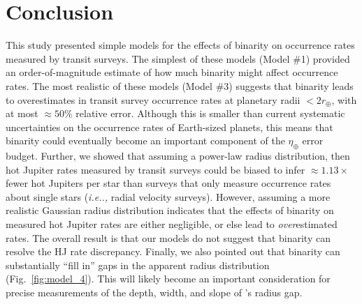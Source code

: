\documentclass[12pt,modern]{aastex61}
\begin{document}

%

\section{Conclusion}
\label{sec:conclusion}

This study presented simple models for the effects of binarity on occurrence 
rates measured by transit surveys.
The simplest of these models (Model \#1) provided an order-of-magnitude 
estimate of how much binarity might affect occurrence rates.
The most realistic of these models (Model \#3) suggests that binarity leads to 
overestimates in transit survey occurrence rates at planetary radii 
$<2r_\oplus$, with at most $\approx 50\%$ relative error.
Although this is smaller than current systematic uncertainties on the 
occurrence rates of Earth-sized planets, this means that binarity could
eventually become an important component of the $\eta_\oplus$ error budget.
Further, we showed that assuming a power-law radius distribution, 
then hot Jupiter rates measured by transit surveys could be biased to infer 
$\approx 1.13\times$ fewer hot Jupiters per star than surveys that only 
measure occurrence rates about single stars ({\it i.e..,} radial velocity 
surveys). However, assuming a more realistic Gaussian radius distribution 
indicates that the effects of binarity on measured hot Jupiter rates are 
either negligible, or else lead to {\it over}estimated rates.
The overall result is that our models do not suggest that binarity can 
resolve the HJ rate discrepancy.
Finally, we also pointed out that binarity can substantially ``fill in'' 
gaps in the apparent radius distribution (Fig.~\ref{fig:model_4}).
This will likely become an important consideration for precise measurements of 
the depth, width, and slope of \citet{fulton_california-_2017}'s radius gap.
\end{document}
